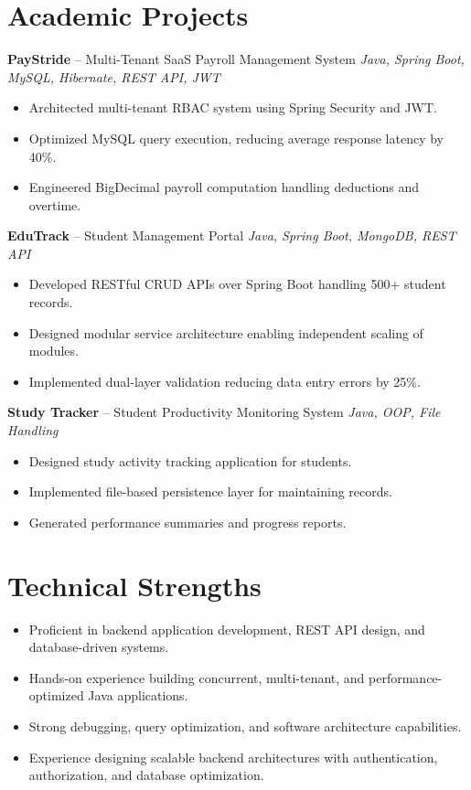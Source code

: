 \documentclass[10.5pt,a4paper]{article}
\begin{document}
\section{Academic Projects}
\textbf{PayStride} -- Multi-Tenant SaaS Payroll Management System \hfill \textit{Java, Spring Boot, MySQL, Hibernate, REST API, JWT}
\begin{itemize}
  \item Architected multi-tenant RBAC system using Spring Security and JWT.
  \item Optimized MySQL query execution, reducing average response latency by 40\%.
  \item Engineered BigDecimal payroll computation handling deductions and overtime.
\end{itemize}
\vspace{4pt}
\textbf{EduTrack} -- Student Management Portal \hfill \textit{Java, Spring Boot, MongoDB, REST API}
\begin{itemize}
  \item Developed RESTful CRUD APIs over Spring Boot handling 500+ student records.
  \item Designed modular service architecture enabling independent scaling of modules.
  \item Implemented dual-layer validation reducing data entry errors by 25\%.
\end{itemize}
\vspace{4pt}
\textbf{Study Tracker} -- Student Productivity Monitoring System \hfill \textit{Java, OOP, File Handling}
\begin{itemize}
  \item Designed study activity tracking application for students.
  \item Implemented file-based persistence layer for maintaining records.
  \item Generated performance summaries and progress reports.
\end{itemize}
\section{Technical Strengths}
\begin{itemize}
  \item Proficient in backend application development, REST API design, and database-driven systems.
  \item Hands-on experience building concurrent, multi-tenant, and performance-optimized Java applications.
  \item Strong debugging, query optimization, and software architecture capabilities.
  \item Experience designing scalable backend architectures with authentication, authorization, and database optimization.
\end{itemize}
\end{document}
